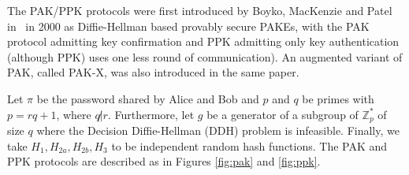 

The PAK/PPK protocols were first introduced by Boyko, MacKenzie and Patel in~\cite{BoMaPa00} in 2000
as Diffie-Hellman based provably secure PAKEs, with the PAK protocol admitting key confirmation
and PPK admitting only key authentication (although PPK) uses one less round of communication). 
An augmented variant of PAK, called PAK-X, was also introduced in the same paper.


Let $\pi$ be the password shared by Alice and Bob and $p$ and $q$ be primes with $p = rq+1$, where $q \not | r$.
Furthermore, let $g$ be a generator of a subgroup of $\mathbb{Z}^\ast_p$ of size $q$ where the Decision
Diffie-Hellman (DDH) problem is infeasible. Finally, we take $H_1, H_{2a}, H_{2b}, H_3$ to be independent random hash 
functions. The PAK and PPK protocols are described as in Figures \ref{fig:pak} and \ref{fig:ppk}. 

